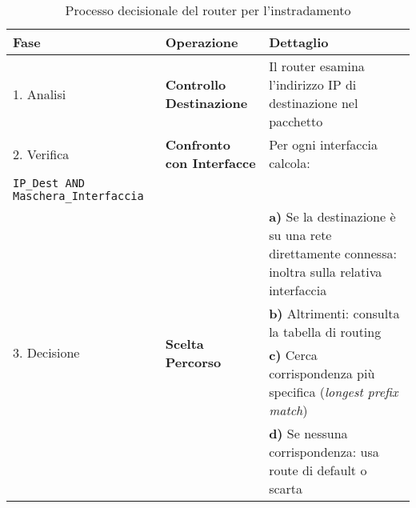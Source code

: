 \begin{table}[h]
    \centering
    \begin{tabular}{|p{2.5cm}|p{5cm}|p{6cm}|}
    \hline
    \rowcolor{bg_custom}
    \textbf{Fase} & \textbf{Operazione} & \textbf{Dettaglio} \\
    \hline
    1. Analisi & \textbf{Controllo Destinazione} & Il router esamina l'indirizzo IP di destinazione nel pacchetto \\
    \hline
    2. Verifica & \textbf{Confronto con Interfacce} & Per ogni interfaccia calcola:\\
    \texttt{IP\_Dest AND Maschera\_Interfaccia} & \\
    \hline
    \multirow{4}{*}{3. Decisione} & \multirow{4}{*}{\textbf{Scelta Percorso}} & \textbf{a)} Se la destinazione è su una rete direttamente connessa: inoltra sulla relativa interfaccia \\
    \cline{3-3}
    & & \textbf{b)} Altrimenti: consulta la tabella di routing \\
    \cline{3-3}
    & & \textbf{c)} Cerca corrispondenza più specifica (\textit{longest prefix match}) \\
    \cline{3-3}
    & & \textbf{d)} Se nessuna corrispondenza: usa route di default o scarta \\
    \hline
    \end{tabular}
    \caption{Processo decisionale del router per l'instradamento}
\end{table}

